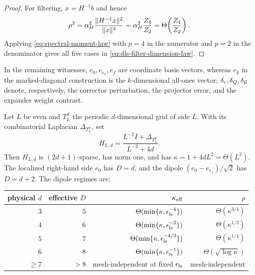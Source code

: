 \begin{proof}
For filtering, $x=H^{-1}b$ and hence
\[
 \rho^2=\alpha_H^2\frac{\lVert H^{-1}x\rVert^2}{\lVert x\rVert^2}
 =\alpha_H^2\frac{Z_4}{Z_2}=\Theta\!\left(\frac{Z_4}{Z_2}\right).
\]
Applying \eqref{eq:spectral-moment-law} with $p=4$ in the numerator and
$p=2$ in the denominator gives all five cases in
\eqref{eq:dls-filter-dimension-law}.
\end{proof}

In the remaining witnesses,
$e_0,e_{e_1},e_f$ are coordinate basis vectors, whereas $e_k$ in the
marked-diagonal construction is the $k$-dimensional all-ones vector;
$\delta_{\rm c},\delta_Q,\delta_{\mathcal G}$ denote, respectively,
the corrector perturbation, the projector error, and the expander weight
contrast.

\begin{proposition}
\label{prop:torus-dimension-witnesses}
Let $L$ be even and $T_L^d$ the periodic $d$-dimensional grid of side
$L$.  With its combinatorial Laplacian $\Delta_{T_L^d}$, set
\begin{equation}
 H_{L,d}=\frac{L^{-2}I+\Delta_{T_L^d}}{L^{-2}+4d}.
 \label{eq:massive-torus}
\end{equation}
Then $H_{L,d}$ is $(2d+1)$-sparse, has norm one, and has
$\kappa=1+4dL^2=\Theta(L^2)$.  The localized right-hand side $e_0$ has
$D=d$, and the dipole $(e_0-e_{e_1})/\sqrt2$ has $D=d+2$.  The dipole
regimes are:
\begin{center}
\begin{tabular}{@{}rrrr@{}}
\toprule
physical $d$ & effective $D$ & $\kappa_{\rm eff}$ & $\rho$ \\
\midrule
$3$ & $5$ & $\Theta(\min\{\kappa,\epsilon_{\rm ls}^{-4}\})$
            & $\Theta(\kappa^{3/4})$ \\
$4$ & $6$ & $\Theta(\min\{\kappa,\epsilon_{\rm ls}^{-2}\})$
            & $\Theta(\kappa^{1/2})$ \\
$5$ & $7$ & $\Theta(\min\{\kappa,\epsilon_{\rm ls}^{-4/3}\})$
            & $\Theta(\kappa^{1/4})$ \\
$6$ & $8$ & $\Theta(\min\{\kappa,\epsilon_{\rm ls}^{-1}\})$
            & $\Theta(\sqrt{\log\kappa})$ \\
$\geq7$ & $>8$ & mesh-independent at fixed $\epsilon_{\rm ls}$
                   & mesh-independent \\
\bottomrule
\end{tabular}
\end{center}
\end{proposition}

